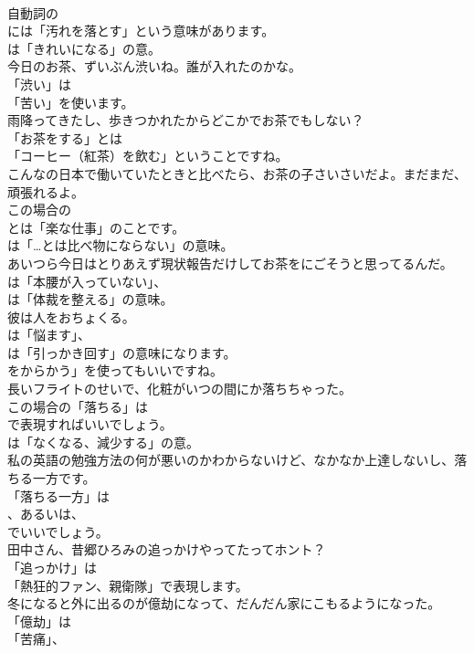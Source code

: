 \documentclass[8pt]{extreport}
\begin{document}
\begin{CJK}{UTF8}{min}
\\	自動詞の 
\\	には「汚れを落とす」という意味があります。
\\	は「きれいになる」の意。	
\\	今日のお茶、ずいぶん渋いね。誰が入れたのかな。 
\\	「渋い」は
\\	「苦い」を使います。	
\\	雨降ってきたし、歩きつかれたからどこかでお茶でもしない？ 
\\	「お茶をする」とは
\\	「コーヒー（紅茶）を飲む」ということですね。	
\\	こんなの日本で働いていたときと比べたら、お茶の子さいさいだよ。まだまだ、頑張れるよ。 
\\	この場合の 
\\	とは「楽な仕事」のことです。
\\	は「…とは比べ物にならない」の意味。	
\\	あいつら今日はとりあえず現状報告だけしてお茶をにごそうと思ってるんだ。 
\\	は「本腰が入っていない」、
\\	は「体裁を整える」の意味。	
\\	彼は人をおちょくる。 
\\	は「悩ます」、
\\	は「引っかき回す」の意味になります。
\\	をからかう」を使ってもいいですね。	
\\	長いフライトのせいで、化粧がいつの間にか落ちちゃった。 
\\	この場合の「落ちる」は 
\\	で表現すればいいでしょう。
\\	は「なくなる、減少する」の意。	
\\	私の英語の勉強方法の何が悪いのかわからないけど、なかなか上達しないし、落ちる一方です。 
\\	「落ちる一方」は
\\	、あるいは、
\\	でいいでしょう。	
\\	田中さん、昔郷ひろみの追っかけやってたってホント？ 
\\	「追っかけ」は
\\	「熱狂的ファン、親衛隊」で表現します。	
\\	冬になると外に出るのが億劫になって、だんだん家にこもるようになった。 
\\	「億劫」は
\\	「苦痛」、

\end{CJK}
\end{document}
